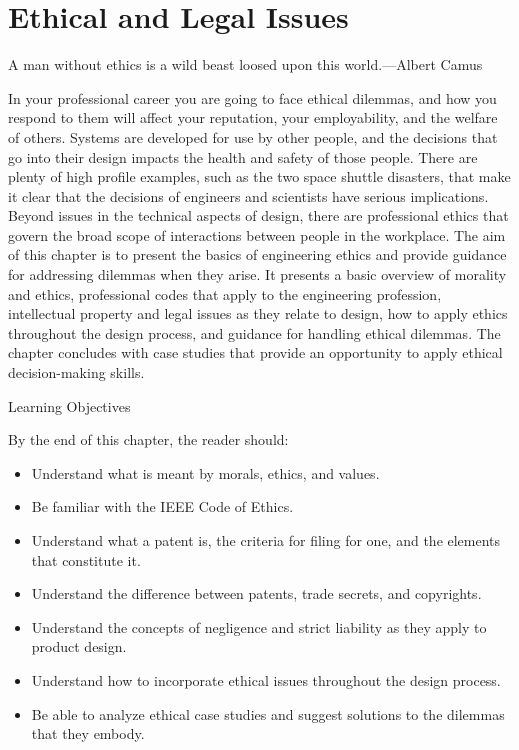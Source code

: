 \chapter{ Ethical and Legal Issues}

A man without ethics is a wild beast loosed upon this world.---Albert
Camus

In your professional career you are going to face ethical dilemmas, and
how you respond to them will affect your reputation, your employability,
and the welfare of others. Systems are developed for use by other
people, and the decisions that go into their design impacts the health
and safety of those people. There are plenty of high profile examples,
such as the two space shuttle disasters, that make it clear that the
decisions of engineers and scientists have serious implications. Beyond
issues in the technical aspects of design, there are professional ethics
that govern the broad scope of interactions between people in the
workplace. The aim of this chapter is to present the basics of
engineering ethics and provide guidance for addressing dilemmas when
they arise. It presents a basic overview of morality and ethics,
professional codes that apply to the engineering profession,
intellectual property and legal issues as they relate to design, how to
apply ethics throughout the design process, and guidance for handling
ethical dilemmas. The chapter concludes with case studies that provide
an opportunity to apply ethical decision-making skills.

Learning Objectives

By the end of this chapter, the reader should:

\begin{itemize}
\item
  Understand what is meant by morals, ethics, and values.
\item
  Be familiar with the IEEE Code of Ethics.
\item
  Understand what a patent is, the criteria for filing for one, and the
  elements that constitute it.
\item
  Understand the difference between patents, trade secrets, and
  copyrights.
\item
  Understand the concepts of negligence and strict liability as they
  apply to product design.
\item
  Understand how to incorporate ethical issues throughout the design
  process.
\item
  Be able to analyze ethical case studies and suggest solutions to the
  dilemmas that they embody.
\end{itemize}

